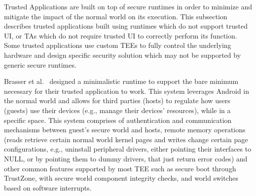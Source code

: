 
Trusted Applications are built on top of secure runtimes in order to minimize and mitigate the impact of the normal world on its execution.
This subsection describes trusted applications built using runtimes which do not support trusted UI, or TAs which do not require trusted UI to correctly perform its function. Some trusted applications use custom TEEs to fully control the underlying hardware and design specific security solution which may not be supported by generic secure runtimes.

Brasser et al.~\cite{brasserregulating} designed a minimalistic runtime to support the bare minimum necessary for their trusted application to work. This system leverages Android in the normal world and allows for third parties (hosts) to regulate how users (guests) use their devices (e.g., manage their devices’ resources), while in a specific space. This system comprises of authentication and communication mechanisms between guest's secure world and hosts, remote memory operations (reads retrieve certain normal world kernel pages and writes change certain page configurations, e.g., uninstall peripheral drivers, either pointing their interfaces to NULL, or by pointing them to dummy drivers, that just return error codes) and other common features supported by most TEE such as secure boot through TrustZone, with secure world component integrity checks, and world switches based on software interrupts.

